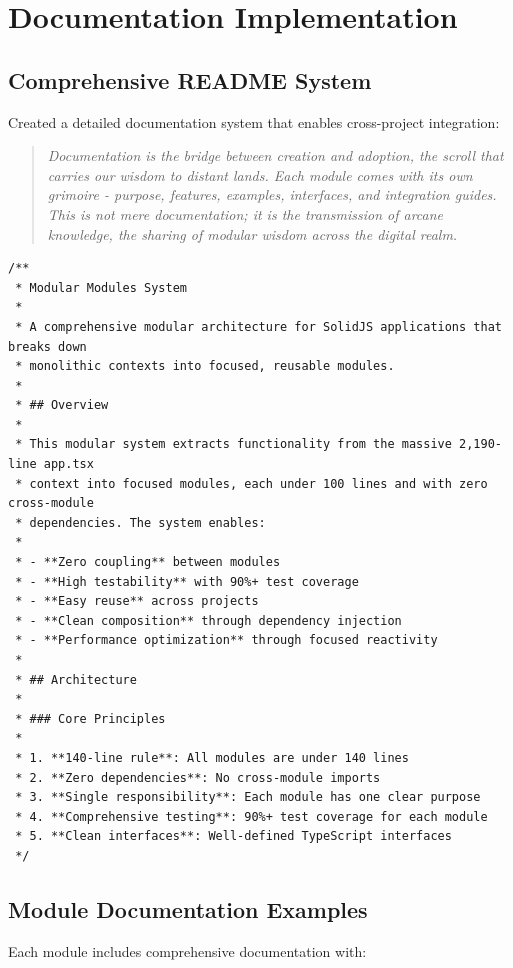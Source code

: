 \documentclass[11pt]{article}
\begin{document}
\section{Documentation Implementation}

\subsection{Comprehensive README System}

Created a detailed documentation system that enables cross-project integration:

\begin{quote}
\emph{Documentation is the bridge between creation and adoption, the scroll that carries our wisdom to distant lands. Each module comes with its own grimoire - purpose, features, examples, interfaces, and integration guides. This is not mere documentation; it is the transmission of arcane knowledge, the sharing of modular wisdom across the digital realm.}
\end{quote}

\begin{lstlisting}[style=typescript]
/**
 * Modular Modules System
 * 
 * A comprehensive modular architecture for SolidJS applications that breaks down 
 * monolithic contexts into focused, reusable modules.
 * 
 * ## Overview
 * 
 * This modular system extracts functionality from the massive 2,190-line app.tsx 
 * context into focused modules, each under 100 lines and with zero cross-module 
 * dependencies. The system enables:
 * 
 * - **Zero coupling** between modules
 * - **High testability** with 90%+ test coverage
 * - **Easy reuse** across projects
 * - **Clean composition** through dependency injection
 * - **Performance optimization** through focused reactivity
 * 
 * ## Architecture
 * 
 * ### Core Principles
 * 
 * 1. **140-line rule**: All modules are under 140 lines
 * 2. **Zero dependencies**: No cross-module imports
 * 3. **Single responsibility**: Each module has one clear purpose
 * 4. **Comprehensive testing**: 90%+ test coverage for each module
 * 5. **Clean interfaces**: Well-defined TypeScript interfaces
 */
\end{lstlisting}

\subsection{Module Documentation Examples}

Each module includes comprehensive documentation with:
\end{document}

